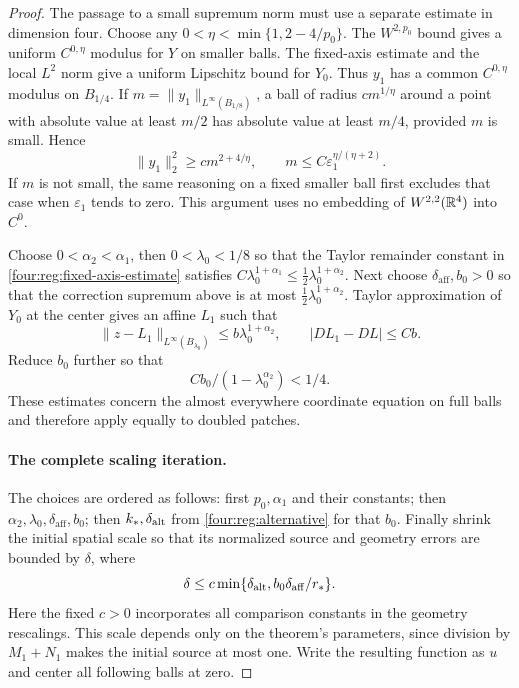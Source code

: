 \begin{proof}
The passage to a small supremum norm must use a separate estimate
in dimension four.  Choose any
$0<\eta<\min\{1,2-4/p_0\}$.  The $W^{2,p_0}$ bound gives a
uniform $C^{0,\eta}$ modulus for $Y$ on smaller balls.  The
fixed-axis estimate and the local $L^2$ norm give a uniform
Lipschitz bound for $Y_0$.  Thus $y_1$ has a common $C^{0,\eta}$
modulus on $B_{1/4}$.  If $m=\|y_1\|_{L^\infty(B_{1/8})}$, a
ball of radius $c m^{1/\eta}$ around a point with absolute value
at least $m/2$ has absolute value at least $m/4$, provided $m$ is
small.  Hence
\[
 \|y_1\|_2^2\ge c m^{2+4/\eta},\qquad
 m\le C\varepsilon_1^{\eta/(\eta+2)}.
\]
If $m$ is not small, the same reasoning on a fixed smaller ball
first excludes that case when $\varepsilon_1$ tends to zero.
This argument uses no embedding of $W^{2,2}(\mathbb R^4)$ into $C^0$.

Choose $0<\alpha_2<\alpha_1$, then $0<\lambda_0<1/8$ so that
the Taylor remainder constant in \eqref{four:reg:fixed-axis-estimate}
satisfies $C\lambda_0^{1+\alpha_1}
\le\tfrac12\lambda_0^{1+\alpha_2}$.
Next choose $\delta_{\mathrm{aff}},b_0>0$ so that the correction supremum above
is at most $\tfrac12\lambda_0^{1+\alpha_2}$.
Taylor approximation of $Y_0$ at the center gives an affine $L_1$
such that
\begin{equation}\label{four:reg:affine-improvement}
 \|z-L_1\|_{L^\infty(B_{\lambda_0})}
       \le b\lambda_0^{1+\alpha_2},\qquad
 |DL_1-DL|\le Cb.
\end{equation}
Reduce $b_0$ further so that
\begin{equation}\label{four:reg:slope-sum}
 Cb_0/(1-\lambda_0^{\alpha_2})<1/4.
\end{equation}
These estimates concern the almost everywhere coordinate equation
on full balls and therefore apply equally to doubled patches.

\paragraph{The complete scaling iteration.}
The choices are ordered as follows: first $p_0,\alpha_1$ and their
constants; then $\alpha_2,\lambda_0,\delta_{\mathrm{aff}},b_0$; then
$k_*,\delta_{\rm alt}$ from \eqref{four:reg:alternative} for that $b_0$.
Finally shrink the initial spatial scale so that its normalized
source and geometry errors are bounded by $\delta$, where
\begin{equation}\label{four:reg:initial-tolerance}
 \delta\le c\min\{\delta_{\rm alt},b_0\delta_{\mathrm{aff}}/r_*\}.
\end{equation}
Here the fixed $c>0$ incorporates all comparison constants in the
geometry rescalings.  This scale depends only on the theorem's
parameters, since division by $M_1+N_1$ makes the initial source
at most one.  Write the resulting function as $u$ and center all
following balls at zero.


\end{proof}
